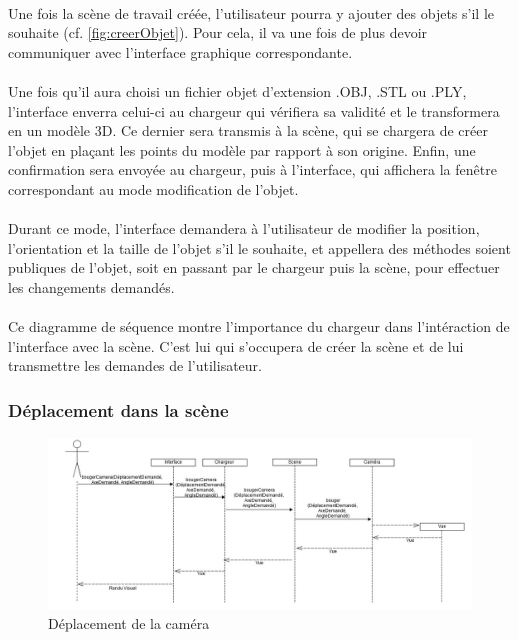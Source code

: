 \paragraph{}
Une fois la scène de travail créée, l'utilisateur pourra y ajouter des objets s'il le souhaite (cf. \ref{fig:creerObjet}). Pour cela, il va une fois de plus devoir communiquer avec l'interface graphique correspondante.

\paragraph{}
Une fois qu'il aura choisi un fichier objet d'extension .OBJ, .STL ou .PLY, l'interface enverra celui-ci au chargeur qui vérifiera sa validité et le transformera en un modèle 3D. Ce dernier sera transmis à la scène, qui se chargera de créer l'objet en plaçant les points du modèle par rapport à son origine. Enfin, une confirmation sera envoyée au chargeur, puis à l'interface, qui affichera la fenêtre correspondant au mode modification de l'objet.

\paragraph{}
Durant ce mode, l'interface demandera à l'utilisateur de modifier la position, l'orientation et la taille de l'objet s'il le souhaite, et appellera des méthodes soient publiques de l'objet, soit en passant par le chargeur puis la scène, pour effectuer les changements demandés.

\paragraph{}
Ce diagramme de séquence montre l'importance du chargeur dans l'intéraction de l'interface avec la scène. C'est lui qui s'occupera de créer la scène et de lui transmettre les demandes de l'utilisateur.


\newpage

\subsubsection{Déplacement dans la scène}

\begin{figure}[h]
		\centering
		\includegraphics[scale=0.4]{bougerCamera.jpg}
		\caption{\label{fig:deplacementCam} Déplacement de la caméra}
\end{figure}

